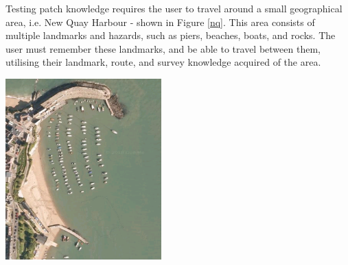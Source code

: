 \documentclass[a4paper, openright, twoside]{report}
\begin{document}
Testing patch knowledge requires the user to travel around a small geographical area, i.e. New Quay Harbour - shown in Figure \ref{nq}. This area consists of multiple landmarks and hazards, such as piers, beaches, boats, and rocks. The user must remember these landmarks, and be able to travel between them, utilising their landmark, route, and survey knowledge acquired of the area. 

\begin{center}
\hfill \break
\includegraphics[width=0.45\textwidth]{images/new_quay}
\label{nq}
\hfill \break
\end{center}


\clearpage


\end{document}
